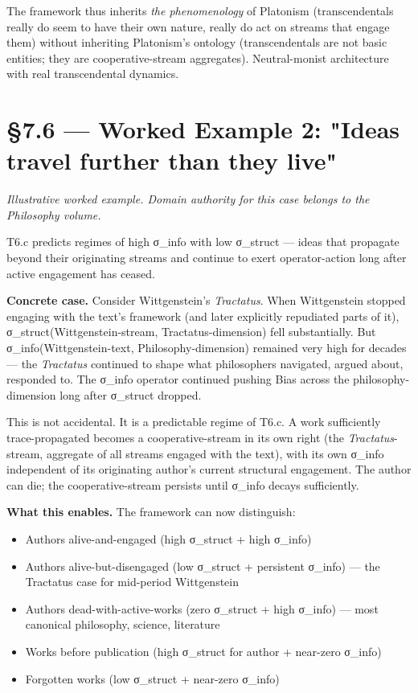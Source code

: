 \documentclass[11pt, openany]{book}
\newcommand{\sectionbreak}{\clearpage}
\begin{document}
The framework thus inherits \textit{the phenomenology} of Platonism (transcendentals really do seem to have their own nature, really do act on streams that engage them) without inheriting Platonism's ontology (transcendentals are not basic entities; they are cooperative-stream aggregates). Neutral-monist architecture with real transcendental dynamics.

\sectionbreak

\section{§7.6 --- Worked Example 2: "Ideas travel further than they live"}

\textit{Illustrative worked example. Domain authority for this case belongs to the Philosophy volume.}

T6.c predicts regimes of high σ\_\allowbreak{}info with low σ\_\allowbreak{}struct --- ideas that propagate beyond their originating streams and continue to exert operator-action long after active engagement has ceased.

\textbf{Concrete case.} Consider Wittgenstein's \textit{Tractatus}. When Wittgenstein stopped engaging with the text's framework (and later explicitly repudiated parts of it), σ\_\allowbreak{}struct(Wittgenstein-stream, Tractatus-dimension) fell substantially. But σ\_\allowbreak{}info(Wittgenstein-text, Philosophy-dimension) remained very high for decades --- the \textit{Tractatus} continued to shape what philosophers navigated, argued about, responded to. The σ\_\allowbreak{}info operator continued pushing Bias across the philosophy-dimension long after σ\_\allowbreak{}struct dropped.

This is not accidental. It is a predictable regime of T6.c. A work sufficiently trace-propagated becomes a cooperative-stream in its own right (the \textit{Tractatus}-stream, aggregate of all streams engaged with the text), with its own σ\_\allowbreak{}info independent of its originating author's current structural engagement. The author can die; the cooperative-stream persists until σ\_\allowbreak{}info decays sufficiently.

\textbf{What this enables.} The framework can now distinguish:
\begin{itemize}
\item Authors alive-and-engaged (high σ\_\allowbreak{}struct + high σ\_\allowbreak{}info)
\item Authors alive-but-disengaged (low σ\_\allowbreak{}struct + persistent σ\_\allowbreak{}info) --- the Tractatus case for mid-period Wittgenstein
\item Authors dead-with-active-works (zero σ\_\allowbreak{}struct + high σ\_\allowbreak{}info) --- most canonical philosophy, science, literature
\item Works before publication (high σ\_\allowbreak{}struct for author + near-zero σ\_\allowbreak{}info)
\item Forgotten works (low σ\_\allowbreak{}struct + near-zero σ\_\allowbreak{}info)
\end{itemize}
\end{document}
